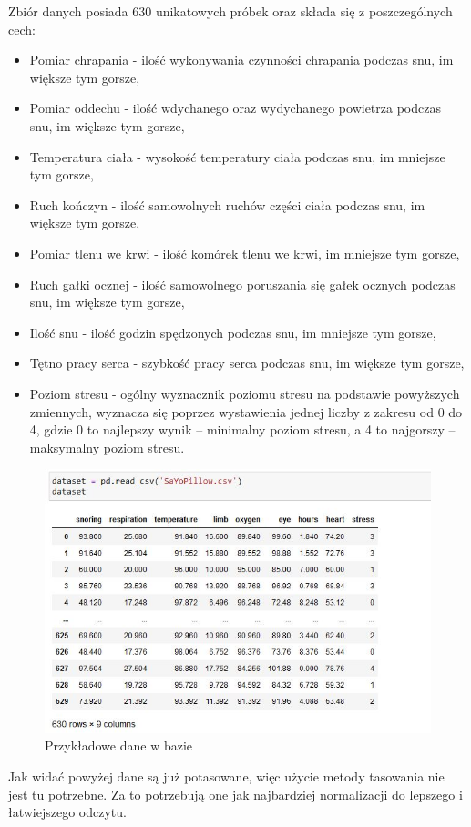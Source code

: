 \documentclass[12pt,a4paper]{article}
\begin{document}
	Zbiór danych posiada 630 unikatowych próbek oraz składa się z poszczególnych cech:
	\begin{itemize}
	    \item Pomiar chrapania - ilość wykonywania czynności chrapania podczas snu, im większe tym gorsze,
	    \item Pomiar oddechu - ilość wdychanego oraz wydychanego powietrza podczas snu, im większe tym gorsze,
	    \item Temperatura ciała - wysokość temperatury ciała podczas snu, im mniejsze tym gorsze,
	    \item Ruch kończyn - ilość samowolnych ruchów części ciała podczas snu, im większe tym gorsze,
	    \item Pomiar tlenu we krwi - ilość komórek tlenu we krwi, im mniejsze tym gorsze,
	    \item Ruch gałki ocznej - ilość samowolnego poruszania się gałek ocznych podczas snu, im większe tym gorsze,
	    \item Ilość snu - ilość godzin spędzonych podczas snu, im mniejsze tym gorsze,
	    \item Tętno pracy serca - szybkość pracy serca podczas snu, im większe tym gorsze,
	    \item Poziom stresu - ogólny wyznacznik poziomu stresu na podstawie powyższych zmiennych, wyznacza się poprzez wystawienia jednej liczby z zakresu od 0 do 4, gdzie 0 to najlepszy wynik -- minimalny poziom stresu, a 4 to najgorszy -- maksymalny poziom stresu.
	\end{itemize}
	
	
		    \begin{figure}[h!]
			\center	
			\includegraphics[width=.9\textwidth]{img/baza.JPG}
			\caption{Przykładowe dane w bazie}
		\end{figure}
		Jak widać powyżej dane są już potasowane, więc użycie metody tasowania nie jest tu potrzebne. Za to potrzebują one jak najbardziej normalizacji do lepszego i łatwiejszego odczytu.\\
		
\end{document}
